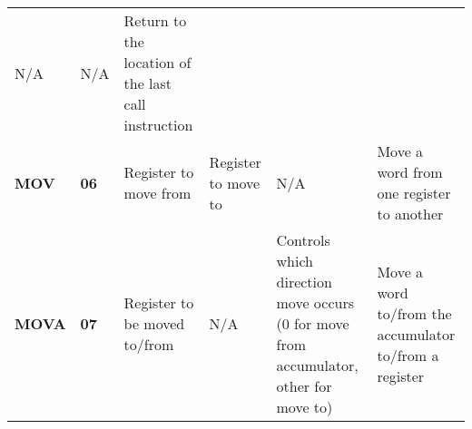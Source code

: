 \documentclass[]{article}
\begin{document}
\begin{longtable}[c]{@{}llllll@{}}
\begin{minipage}[t]{0.14\columnwidth}
N/A
\strut\end{minipage} &
\begin{minipage}[t]{0.14\columnwidth}\raggedright\strut
N/A
\strut\end{minipage} &
\begin{minipage}[t]{0.14\columnwidth}\raggedright\strut
Return to the location of the last call instruction
\strut\end{minipage}\tabularnewline
\begin{minipage}[t]{0.14\columnwidth}\raggedright\strut
\textbf{MOV}
\strut\end{minipage} &
\begin{minipage}[t]{0.14\columnwidth}\raggedright\strut
\textbf{06}
\strut\end{minipage} &
\begin{minipage}[t]{0.14\columnwidth}\raggedright\strut
Register to move from
\strut\end{minipage} &
\begin{minipage}[t]{0.14\columnwidth}\raggedright\strut
Register to move to
\strut\end{minipage} &
\begin{minipage}[t]{0.14\columnwidth}\raggedright\strut
N/A
\strut\end{minipage} &
\begin{minipage}[t]{0.14\columnwidth}\raggedright\strut
Move a word from one register to another
\strut\end{minipage}\tabularnewline
\begin{minipage}[t]{0.14\columnwidth}\raggedright\strut
\textbf{MOVA}
\strut\end{minipage} &
\begin{minipage}[t]{0.14\columnwidth}\raggedright\strut
\textbf{07}
\strut\end{minipage} &
\begin{minipage}[t]{0.14\columnwidth}\raggedright\strut
Register to be moved to/from
\strut\end{minipage} &
\begin{minipage}[t]{0.14\columnwidth}\raggedright\strut
N/A
\strut\end{minipage} &
\begin{minipage}[t]{0.14\columnwidth}\raggedright\strut
Controls which direction move occurs (0 for move from accumulator, other
for move to)
\strut\end{minipage} &
\begin{minipage}[t]{0.14\columnwidth}\raggedright\strut
Move a word to/from the accumulator to/from a register

\end{minipage}
\end{longtable}
\end{document}
